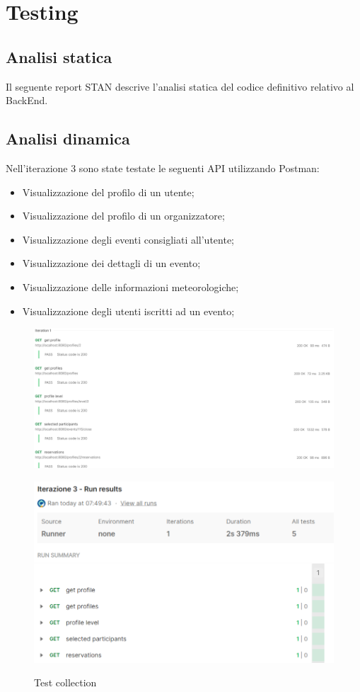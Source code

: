 \section{Testing}
\subsection{Analisi statica}
Il seguente report STAN descrive l'analisi statica del codice definitivo relativo al BackEnd.
\\

\subsection{Analisi dinamica}
Nell’iterazione 3 sono state testate le seguenti API utilizzando Postman:
\begin{itemize}
	\item Visualizzazione del profilo di un utente;
	\item Visualizzazione del profilo di un organizzatore;
	\item Visualizzazione degli eventi consigliati all'utente;
  \item Visualizzazione dei dettagli di un evento;
  \item Visualizzazione delle informazioni meteorologiche;
  \item Visualizzazione degli utenti iscritti ad un evento;
\end{itemize}
\begin{figure}[h!]
\begin{center}
  \includegraphics[width=1\textwidth]{Iterazione 3/images/it3_api.PNG}\\
  \caption{Test collection}
  \includegraphics[width=1\textwidth]{Iterazione 3/images/it3.png}\\
\end{center}
\end{figure}
